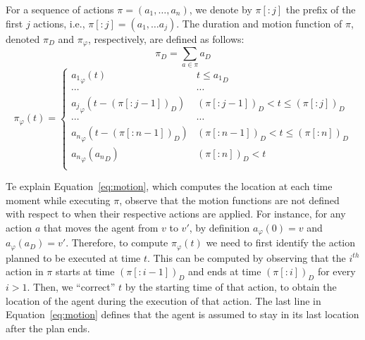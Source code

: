 \documentclass[review]{elsarticle}
\newcommand\konstantin[1]{\nb{\textbf{Konstantin:}}{red}{#1}}
\newcommand\roni[1]{\nb{\textbf{Roni:}}{green}{#1}}
\begin{document}
For a sequence of actions $\pi=(a_1,\ldots, a_n)$, 
we denote by $\pi[:j]$ the prefix of the first $j$ actions, i.e., 
$\pi[:j]=(a_1,\ldots a_j)$. The duration and motion function of $\pi$, denoted 
$\pi_D$ and $\pi_\varphi$, respectively, are defined as follows: 
\begin{equation}
    \pi_D=\sum_{a\in\pi} a_D
\end{equation}
\begin{equation}
    \pi_\varphi(t)=
    \begin{cases}
        {a_1}_\varphi(t)  & t\leq {a_1}_D \\
        \cdots & \cdots  \\
        {a_j}_\varphi(t-(\pi[:j-1])_D) & (\pi[:j-1])_D < t \leq (\pi[:j])_D \\
        \cdots & \cdots  \\
        {a_n}_\varphi(t-(\pi[:n-1])_D) & (\pi[:n-1])_D < t \leq (\pi[:n])_D \\
        {a_n}_\varphi({a_n}_D) & (\pi[:n])_D < t \\
        
    \end{cases}
    \label{eq:motion}
\end{equation}


Te explain Equation~\ref{eq:motion}, which computes the location at each time moment while executing $\pi$, observe that the motion functions are not defined with respect to when their respective actions are applied. For instance, for any action $a$ that moves the agent from $v$ to $v'$, by definition $a_\varphi(0)=v$ and $a_\varphi(a_D)=v'$.
Therefore, to compute $\pi_\varphi(t)$ we need to first identify the action planned to be executed at time $t$. 
This can be computed by observing that the $i^{th}$ action in $\pi$ starts at time $(\pi[:i-1])_D$ and ends at time $(\pi[:i])_D$ for every $i>1$. 
Then, we ``correct'' $t$ by the starting time of that action, to obtain the location of the agent during the execution of that action. 
The last line in Equation~\ref{eq:motion} defines that the agent is assumed to stay in its last location after the plan ends. 
\end{document}
